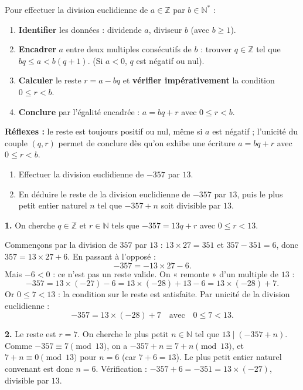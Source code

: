 \documentclass[11pt]{article}
\begin{document}
\begin{methode}
Pour effectuer la division euclidienne de $a \in \mathbb{Z}$ par $b \in \mathbb{N}^*$ :
\begin{enumerate}
\item \textbf{Identifier} les données : dividende $a$, diviseur $b$ (avec $b \geq 1$).
\item \textbf{Encadrer} $a$ entre deux multiples consécutifs de $b$ : trouver $q \in \mathbb{Z}$ tel que $bq \leq a < b(q+1)$. (Si $a < 0$, $q$ est négatif ou nul).
\item \textbf{Calculer} le reste $r = a - bq$ et \textbf{vérifier impérativement} la condition $0 \leq r < b$.
\item \textbf{Conclure} par l'égalité encadrée : $a = bq + r$ avec $0 \leq r < b$.
\end{enumerate}
\textbf{Réflexes :} le reste est toujours positif ou nul, même si $a$ est négatif ; l'unicité du couple $(q, r)$ permet de conclure dès qu'on exhibe une écriture $a = bq + r$ avec $0 \leq r < b$.
\end{methode}

\begin{exoresolu}
\begin{enumerate}
\item Effectuer la division euclidienne de $-357$ par $13$.
\item En déduire le reste de la division euclidienne de $-357$ par $13$, puis le plus petit entier naturel $n$ tel que $-357 + n$ soit divisible par $13$.
\end{enumerate}
\tcblower
\textbf{1.} On cherche $q \in \mathbb{Z}$ et $r \in \mathbb{N}$ tels que $-357 = 13q + r$ avec $0 \leq r < 13$.

Commençons par la division de $357$ par $13$ : $13 \times 27 = 351$ et $357 - 351 = 6$, donc $357 = 13 \times 27 + 6$. En passant à l'opposé :
\[ -357 = -13 \times 27 - 6. \]
Mais $-6 < 0$ : ce n'est pas un reste valide. On « remonte » d'un multiple de $13$ :
\[ -357 = 13 \times (-27) - 6 = 13 \times (-28) + 13 - 6 = 13 \times (-28) + 7. \]
Or $0 \leq 7 < 13$ : la condition sur le reste est satisfaite. Par unicité de la division euclidienne :
\[ \boxed{-357 = 13 \times (-28) + 7 \quad \text{avec} \quad 0 \leq 7 < 13.} \]

\textbf{2.} Le reste est $r = 7$. On cherche le plus petit $n \in \mathbb{N}$ tel que $13 \mid (-357 + n)$. Comme $-357 \equiv 7 \pmod{13}$, on a $-357 + n \equiv 7 + n \pmod{13}$, et $7 + n \equiv 0 \pmod{13}$ pour $n = 6$ (car $7 + 6 = 13$). Le plus petit entier naturel convenant est donc $n = 6$. Vérification : $-357 + 6 = -351 = 13 \times (-27)$, divisible par $13$.
\end{exoresolu}
\end{document}
